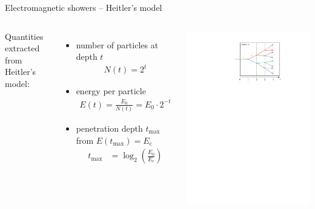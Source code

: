 \documentclass[11pt,xcolor=dvipsnames,professionalfonts,notes]{beamer}
\begin{document}
\begin{frame}{Electromagnetic showers -- Heitler's model}
	\begin{columns}
		Quantities extracted from Heitler's model:
		\begin{itemize}
			\setlength\itemsep{1.em}
			\item number of particles at depth $t$
			\begin{align*}
				N(t) = 2^t
			\end{align*}
			
			\item energy per particle
			\begin{align*}
				E(t) = \frac{E_0}{N(t)} = E_0 \cdot 2^{-t}
			\end{align*}
			
			\item penetration depth $t_\mathrm{max}$ from $E(t_\mathrm{max}) = E_\mathrm{c}$
			\begin{align*}
				t_\mathrm{max} &= \log_2\left(\frac{E_0}{E_\mathrm{c}}\right)
			\end{align*}
		\end{itemize}
		
		\begin{center}
			\includegraphics[width=1.0\textwidth]{./figures/shower_cascadeunits.pdf}
		\end{center}
	\end{columns}
\end{frame}
\end{document}
